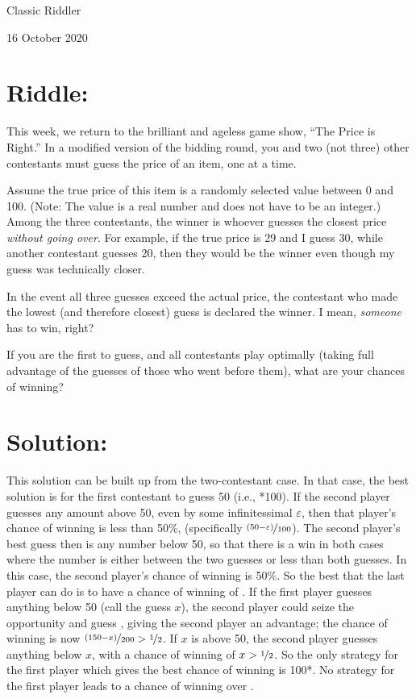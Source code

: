\documentclass{article}
\begin{document}
\pagestyle{empty} %

\begin{center}
{\LARGE Classic Riddler}

\vspace{0.15in}

{\Large 16 October 2020}
\end{center}


\section*{Riddle:}

This week, we return to the brilliant and ageless game show, ``The Price is Right.''
In a modified version of the bidding round, you and two (not three) other contestants must guess the price of an item, one at a time.

Assume the true price of this item is a randomly selected value between 0 and 100.
(Note: The value is a real number and does not have to be an integer.)
Among the three contestants, the winner is whoever guesses the closest price \textit{without going over}.
For example, if the true price is 29 and I guess 30, while another contestant guesses 20, then they would be the winner even though my guess was technically closer.

In the event all three guesses exceed the actual price, the contestant who made the lowest (and therefore closest) guess is declared the winner.
I mean, \textit{someone} has to win, right?

If you are the first to guess, and all contestants play optimally (taking full advantage of the guesses of those who went before them), what are your chances of winning?

\section*{Solution:}

This solution can be built up from the two-contestant case.
In that case, the best solution is for the first contestant to guess 50 (i.e., *100).
If the second player guesses any amount above 50, even by some infinitessimal $\varepsilon$, then that player's chance of winning is less than 50\%, (specifically $\nicefrac{(50-\varepsilon)}{100}$).
The second player's best guess then is any number below 50, so that there is a win in both cases where the number is either between the two guesses or less than both guesses.
In this case, the second player's chance of winning is 50\%.
So the best that the last player can do is to have a chance of winning of .
If the first player guesses anything below 50 (call the guess $x$), the second player could seize the opportunity and guess , giving the second player an advantage; the chance of winning is now $\nicefrac{(150-x)}{200}>\nicefrac{1}{2}$.
If $x$ is above 50, the second player guesses anything below $x$, with a chance of winning of $x>\nicefrac{1}{2}$.
So the only strategy for the first player which gives the best chance of winning is 100*.
No strategy for the first player leads to a chance of winning over .
\end{document}
